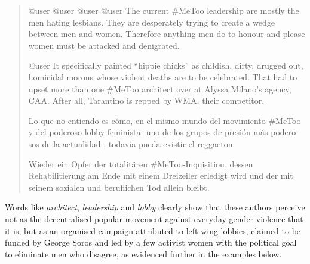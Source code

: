\documentclass[output=paper,english,spanish,german,english]{langsci/langscibook}
\begin{document}
\begin{quote}\sffamily
  @user @user @user @user The current \#MeToo leadership are mostly the men hating lesbians. They are desperately trying to create a wedge between men and women. Therefore anything men do to honour and please women must be attacked and denigrated.

  @user It specifically painted \enquote{hippie chicks} as childish, dirty, drugged out, homicidal morons whose violent deaths are to be celebrated. That had to upset more than one \#MeToo architect over at Alyssa Milano’s agency, CAA. After all, Tarantino is repped by WMA, their competitor.

  \foreignlanguage{spanish}{Lo que no entiendo es cómo, en el mismo mundo del movimiento \#MeToo y del poderoso lobby feminista -uno de los grupos de presión más poderosos de la actualidad-, todavía pueda existir el reggaeton}

  Wieder ein Opfer der totalitären \#MeToo-Inquisition, dessen Rehabilitierung am Ende mit einem Dreizeiler erledigt wird und der mit seinem sozialen und beruflichen Tod allein bleibt.
\end{quote}

\noindent Words like \textit{architect}, \textit{leadership} and \textit{lobby} clearly show that these authors perceive \mt not as the decentralised popular movement against everyday gender violence that it is, but as an organised campaign attributed to left-wing lobbies, claimed to be funded by George Soros and led by a few activist women with the political goal to eliminate men who disagree, as evidenced further in the examples below.
\end{document}
